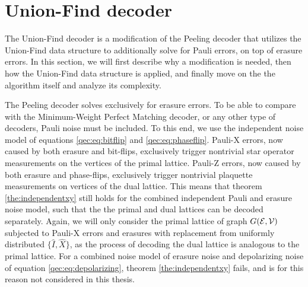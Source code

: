 \section{Union-Find decoder}\label{sec:ufdecoder}
The Union-Find decoder \cite{delfosse2017almost} is a modification of the Peeling decoder that utilizes the Union-Find data structure \cite{tarjan1975efficiency} to additionally solve for Pauli errors, on top of erasure errors. In this section, we will first describe why a modification is needed, then how the Union-Find data structure is applied, and finally move on the the algorithm itself and analyze its complexity.

The Peeling decoder solves exclusively for erasure errors. To be able to compare with the Minimum-Weight Perfect Matching decoder, or any other type of decoders, Pauli noise must be included. To this end, we use the independent noise model of equations \eqref{qec:eq:bitflip} and \eqref{qec:eq:phaseflip}. Pauli-X errors, now caused by both erasure and bit-flips, exclusively trigger nontrivial star operator measurements on the vertices of the primal lattice. Pauli-Z errors, now caused by both erasure and phase-flips, exclusively trigger nontrivial plaquette measurements on vertices of the dual lattice. This means that theorem \ref{the:independentxy} still holds for the combined independent Pauli and erasure noise model, such that the the primal and dual lattices can be decoded separately. Again, we will only consider the primal lattice of graph $G(\mathcal{E},\mathcal{V})$ subjected to Pauli-X errors and erasures with replacement from uniformly distributed $\{\hat{I}, \hat{X}\}$, as the process of decoding the dual lattice is analogous to the primal lattice. For a combined noise model of erasure noise and depolarizing noise of equation \eqref{qec:eq:depolarizing}, theorem \ref{the:independentxy} fails, and is for this reason not considered in this thesis.

